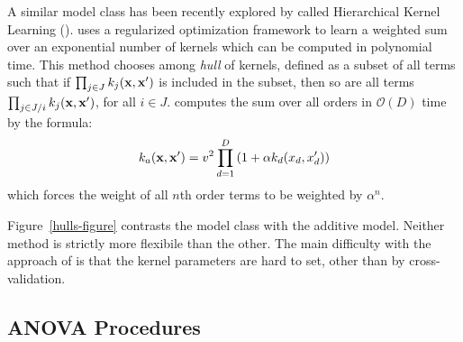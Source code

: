 A similar model class has been recently explored by \citet{DBLP:journals/corr/abs-0909-0844} called Hierarchical Kernel Learning (\HKL{}).
\HKL{} uses a regularized optimization framework to learn a weighted sum over an exponential number of kernels which can be computed in polynomial time.
This method chooses among \textit{hull} of kernels, defined as a subset of all terms such that if $\prod_{j \in J} k_j(\bf x, x')$ is included in the subset, then so are all terms $\prod_{j \in J / i} k_j(\bf x, x')$, for all $i \in J$.
\HKL{} computes the sum over all orders in $\mathcal{O}(D)$ time by the formula:
\begin{equation}
\label{eqn:uniform}
k_{a}({\bf x, x'}) = v^2 \prod_{d=1}^D \left(1 + \alpha k_{d}(x_{d}, x_{d}') \right)
\end{equation}
which forces the weight of all $n$th order terms to be weighted by $\alpha^n$.

Figure~\ref{hulls-figure} contrasts the \HKL{} model class with the additive \gp{} model.
Neither method is strictly more flexibile than the other.
The main difficulty with the approach of \citet{DBLP:journals/corr/abs-0909-0844} is that the kernel parameters are hard to set, other than by cross-validation.


\subsection{ANOVA Procedures}

